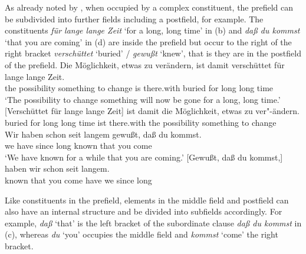 As already noted by \citet[]{Reis80a}, when occupied by a complex constituent, the prefield can be subdivided into 
further fields including a postfield, for example. The constituents \emph{für lange lange Zeit} `for a long, long
time' in (b) and  \emph{daß du kommst} `that you are coming' in (d) are inside the prefield but occur
to the right of the right bracket \emph{verschüttet} `buried' / \emph{gewußt} `knew', that is they are in the postfield
of the prefield.
\eal
\label{Beispiel-topologisch-komplexes-Vorfeld}
\ex
\gll Die Möglichkeit, etwas zu verändern, ist damit verschüttet für lange lange Zeit.\\
	 the possibility something to change is there.with buried for long long time\\
\glt `The possibility to change something will now be gone for a long, long time.'	  
\ex 
\gll {}[Verschüttet für lange lange Zeit] ist damit die Möglichkeit,      etwas zu ver"-ändern.\\
      \spacebr{}buried for long long time ist there.with the possibility  something to change\\
\ex 
\gll Wir haben schon seit langem gewußt, daß du kommst.\\
     we have \particle{} since long known that you come\\
\glt `We have known for a while that you are coming.'
\ex 
\gll {}[Gewußt, daß du kommst,] haben wir schon seit langem.\\
	 \spacebr{}known that you come have we \particle{} since long\\
\zl


\noindent
Like constituents in the prefield, elements in the middle field and postfield can also have an internal structure and be divided into subfields accordingly.
For example, \emph{daß} `that' is the left bracket of the subordinate clause \emph{daß du kommst} in (c), whereas \emph{du} `you' occupies the middle
field and \emph{kommst} `come' the right bracket.%


%
%


